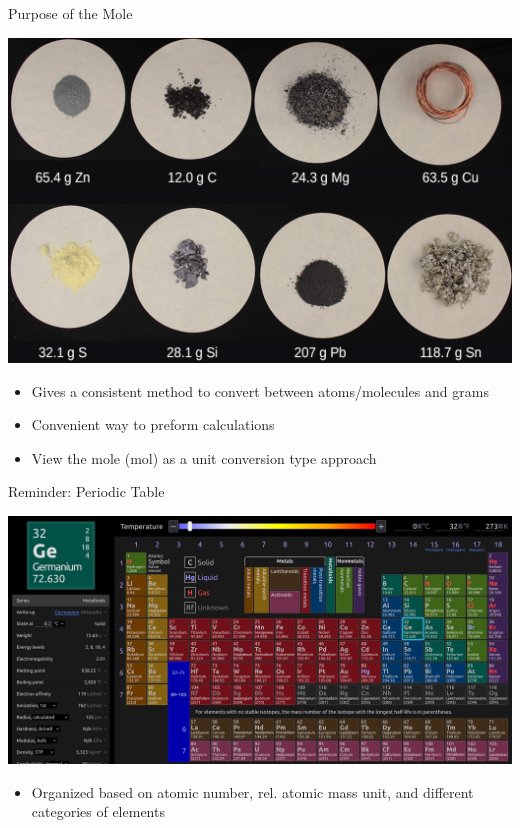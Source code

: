 \documentclass[11pt]{beamer}
\begin{document}
\begin{frame}{Purpose of the Mole}
  \begin{center}
    \includegraphics[scale=0.1]{mol_solids}
  \end{center}
  
  \begin{itemize}
  \item Gives a consistent method to convert between atoms/molecules and grams
  \item Convenient way to preform calculations
  \item View the mole (mol) as a unit conversion type approach
  \end{itemize}
\end{frame}

\begin{frame}{Reminder: Periodic Table}
  \begin{center}
    \includegraphics[width=\linewidth]{ptable}
  \end{center}

  \begin{itemize}
  \item Organized based on atomic number,  rel. atomic mass unit,
    and different categories of elements
  \end{itemize}
\end{frame}
\end{document}
